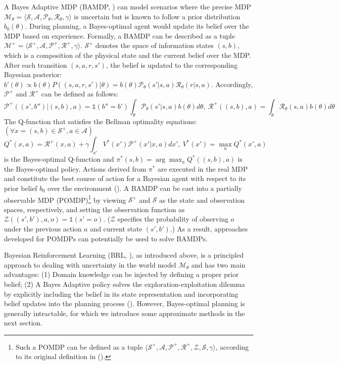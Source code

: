 A Bayes Adaptive MDP (BAMDP, \cite{duff2002optimal}) can model scenarios where the precise MDP $\mathcal{M}_\theta=\langle \mathcal{S}, \mathcal{A}, \mathcal{P}_\theta, \mathcal{R}_\theta, \gamma \rangle$ is uncertain but is known to follow a prior distribution $b_0(\theta)$. During planning, a Bayes-optimal agent would update its belief over the MDP based on experience. Formally, a BAMDP can be described as a tuple $\mathcal{M}^+=\langle \mathcal{S}^+, \mathcal{A}, \mathcal{P}^+, \mathcal{R}^+, \gamma \rangle$. $\mathcal{S}^+$ denotes the space of information states $(s, b)$, which is a composition of the physical state and the current belief over the MDP. After each transition $(s, a, r, s')$, the belief is updated to the corresponding Bayesian posterior: $b'(\theta) \propto b(\theta) P((s, a, r, s') | \theta) = b(\theta) \mathcal{P}_\theta(s' | s, a) \mathcal{R}_\theta(r | s, a)$. Accordingly, $\mathcal{P}^+$ and $\mathcal{R}^+$ can be defined as follows:
\begin{equation} \label{bamdp-mdp}
    \mathcal{P}^+((s', b'') | (s, b), a) = \mathds{1}(b''=b')\int_{\theta} \mathcal{P}_\theta(s' | s, a) b(\theta) d\theta,\ \mathcal{R}^+((s, b), a) = \int_{\theta} \mathcal{R}_\theta(s, a) b(\theta) d\theta
\end{equation}
The Q-function that satisfies the Bellman optimality equations: $(\forall x=(s, b) \in \mathcal{S}^+, a \in \mathcal{A})$
\begin{equation}
    Q^*(x, a) = \mathcal{R}^+(x, a) + \gamma \int_{x'} V^*(x') \mathcal{P}^+(x'|x, a) d x',\ V^*(x') = \max_a Q^*(x', a)
\end{equation}
is the Bayes-optimal Q-function and $\pi^*(s, b) = \arg \max_a Q^*((s, b), a)$ is the Bayes-optimal policy. Actions derived from $\pi^*$ are executed in the real MDP and constitute the best course of action for a Bayesian agent with respect to its prior belief $b_0$ over the environment (\cite{DBLP:conf/nips/GuezHSD14}). A BAMDP can be cast into a partially observable MDP (POMDP)\footnote{Such a POMDP can be defined as a tuple $\langle \mathcal{S}^+, \mathcal{A}, \mathcal{P}^+, \mathcal{R}^+, \mathcal{Z}, \mathcal{S}, \gamma \rangle$, according to its original definition in (\cite{littman2009tutorial}).} by viewing $\mathcal{S}^+$ and $\mathcal{S}$ as the state and observation spaces, respectively, and setting the observation function as $\mathcal{Z}((s', b'), a, o) = \mathds{1}(s'=o)$. ($\mathcal{Z}$ specifies the probability of observing $o$ under the previous action $a$ and current state $(s', b')$.) As a result, approaches developed for POMDPs can potentially be used to solve BAMDPs. 

Bayesian Reinforcement Learning (BRL, \cite{DBLP:journals/ftml/GhavamzadehMPT15}), as introduced above, is a principled approach to dealing with uncertainty in the world model $\mathcal{M}_\theta$ and has two main advantages: (1) Domain knowledge can be injected by defining a proper prior belief; (2) A Bayes Adaptive policy solves the exploration-exploitation dilemma by explicitly including the belief in its state representation and incorporating belief updates into the planning process (\cite{DBLP:conf/uai/SorgSL10}). However, Bayes-optimal planning is generally intractable, for which we introduce some approximate methods in the next section.